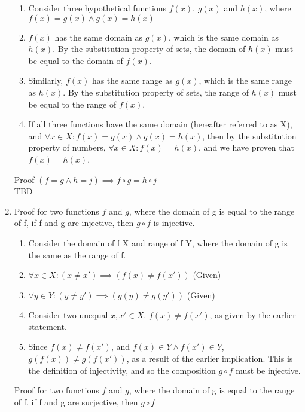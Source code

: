 \documentclass{article}
\begin{document}
\begin{enumerate}
\begin{enumerate}
                \item Consider three hypothetical functions $f(x)$, $g(x)$ and $h(x)$, where $f(x)=g(x) \land g(x)=h(x)$
                \item $f(x)$ has the same domain as $g(x)$, which is the same domain as $h(x)$. By the substitution property of sets,
                    the domain of $h(x)$ must be equal to the domain of $f(x)$.
                \item Similarly, $f(x)$ has the same range as $g(x)$, which is the same range as $h(x)$. By the substitution property of sets,
                    the range of $h(x)$ must be equal to the range of $f(x)$.
                \item If all three functions have the same domain (hereafter referred to as X), and $\forall x \in X: f(x) = g(x) \land g(x) = h(x)$,
                    then by the substitution property of numbers, $\forall x \in X: f(x) = h(x)$, and we have proven that $f(x) = h(x)$.
            \end{enumerate}
            Proof $(f = g \land h = j) \implies f \circ g = h \circ j$ \\
            TBD
        \item Proof for two functions $f$ and $g$, where the domain of g is
            equal to the range of f, if f and g are injective, then $g \circ f$
            is injective.
            \begin{enumerate}
                \item Consider the domain of f X and range of f Y, where the domain of g is the same as the range of f.
                \item $\forall x \in X: (x \neq x') \implies (f(x) \neq f(x'))$ (Given)
                \item $\forall y \in Y: (y \neq y') \implies (g(y) \neq g(y'))$ (Given)
                \item Consider two unequal $x,x' \in X$. $f(x) \neq f(x')$, as given by the earlier statement.
                \item Since $f(x) \neq f(x')$, and $f(x) \in Y \land f(x') \in
                    Y$, $g(f(x)) \neq g(f(x'))$, as a result of the earlier
                    implication. This is the definition of injectivity, and so the
                    composition $g \circ f$ must be injective.
            \end{enumerate}
            Proof for two functions $f$ and $g$, where the domain of g is
            equal to the range of f, if f and g are surjective, then $g \circ f$

\end{enumerate}
\end{document}
